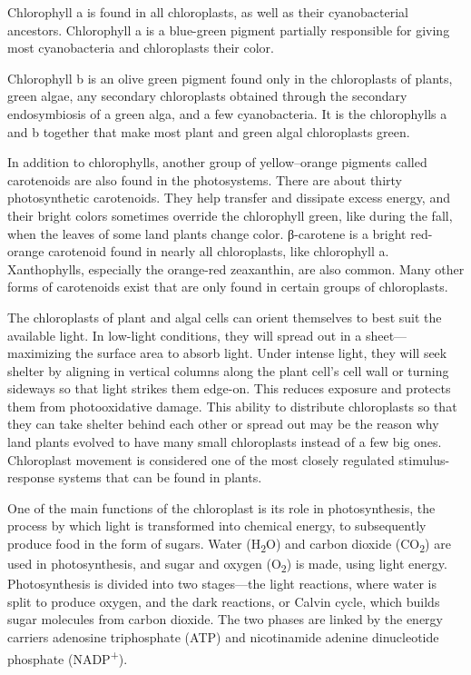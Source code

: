 Chlorophyll a is found in all chloroplasts, as well as their cyanobacterial ancestors. Chlorophyll a is a blue-green pigment partially responsible for giving most cyanobacteria and chloroplasts their color.

Chlorophyll b is an olive green pigment found only in the chloroplasts of plants, green algae, any secondary chloroplasts obtained through the secondary endosymbiosis of a green alga, and a few cyanobacteria. It is the chlorophylls a and b together that make most plant and green algal chloroplasts green.

In addition to chlorophylls, another group of yellow--orange pigments called carotenoids are also found in the photosystems. There are about thirty photosynthetic carotenoids. They help transfer and dissipate excess energy, and their bright colors sometimes override the chlorophyll green, like during the fall, when the leaves of some land plants change color. β-carotene is a bright red-orange carotenoid found in nearly all chloroplasts, like chlorophyll a. Xanthophylls, especially the orange-red zeaxanthin, are also common. Many other forms of carotenoids exist that are only found in certain groups of chloroplasts.

The chloroplasts of plant and algal cells can orient themselves to best suit the available light. In low-light conditions, they will spread out in a sheet---maximizing the surface area to absorb light. Under intense light, they will seek shelter by aligning in vertical columns along the plant cell's cell wall or turning sideways so that light strikes them edge-on. This reduces exposure and protects them from photooxidative damage. This ability to distribute chloroplasts so that they can take shelter behind each other or spread out may be the reason why land plants evolved to have many small chloroplasts instead of a few big ones. Chloroplast movement is considered one of the most closely regulated stimulus-response systems that can be found in plants.

One of the main functions of the chloroplast is its role in photosynthesis, the process by which light is transformed into chemical energy, to subsequently produce food in the form of sugars. Water (H\textsubscript{2}O) and carbon dioxide (CO\textsubscript{2}) are used in photosynthesis, and sugar and oxygen (O\textsubscript{2}) is made, using light energy. Photosynthesis is divided into two stages---the light reactions, where water is split to produce oxygen, and the dark reactions, or Calvin cycle, which builds sugar molecules from carbon dioxide. The two phases are linked by the energy carriers adenosine triphosphate (ATP) and nicotinamide adenine dinucleotide phosphate (NADP\textsuperscript{+}).

